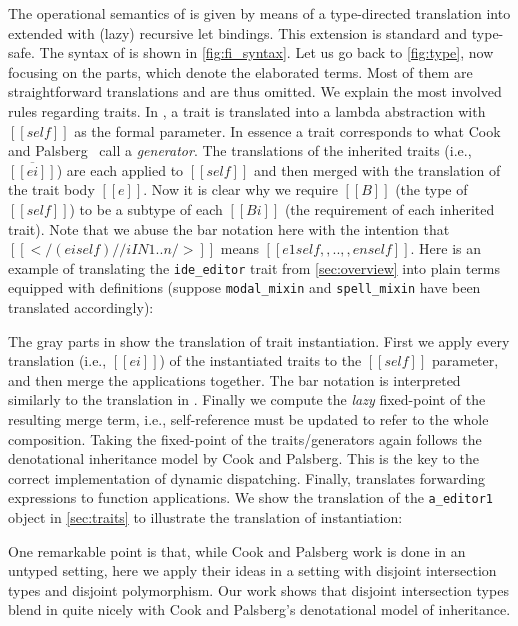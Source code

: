 The operational semantics of \name is given by means of a type-directed
translation into \bname extended with (lazy) recursive let bindings.
This extension is standard and type-safe. The syntax of \bname is shown in \cref{fig:fi_syntax}. Let us go back to
\cref{fig:type}, now focusing on the  parts, which
denote the elaborated \bname terms. Most of them
are straightforward translations and are thus omitted. We explain the most
involved rules regarding traits. In , a trait is translated into
a lambda abstraction with $[[self]]$ as the formal parameter.
In essence a trait corresponds to what Cook and Palsberg~\cite{cook1989denotational} call a \emph{generator}.
 The translations
of the inherited traits (i.e., $\overline{[[ei]]}$) are each applied to
$[[self]]$ and then merged with the translation of the trait body $[[e]]$. Now
it is clear why we require $[[B]]$ (the type of $[[self]]$) to be a subtype of each
$[[Bi]]$ (the requirement of each inherited trait). Note that we abuse the bar
notation here with the intention that $[[</ (ei self) // i IN 1..n />]]$ means
$[[e1 self ,, .. ,, en self]]$.
Here is an example of translating the \lstinline{ide_editor} trait from \cref{sec:overview} into
plain \bname terms equipped with definitions (suppose \lstinline{modal_mixin} and \lstinline{spell_mixin}
have been translated accordingly):

The gray parts in  show the translation of trait instantiation.
First we apply every translation (i.e., $[[ei]]$) of the instantiated traits to the $[[self]]$ parameter,
and then merge the applications together. The bar notation is
interpreted similarly to the translation in . Finally we compute the \emph{lazy}
fixed-point of the resulting merge term, i.e., self-reference must be updated to refer to
the whole composition. Taking the fixed-point of the
traits/generators again follows the denotational inheritance model by 
Cook and Palsberg.
 This is the key to the correct implementation of dynamic
 dispatching. Finally,
 translates forwarding expressions to function
applications. We show the translation of the
\lstinline{a_editor1} object in \cref{sec:traits} to illustrate the
translation of instantiation:

One remarkable point is that, while Cook and Palsberg work is done in
an untyped setting, here we apply their ideas in a setting with
disjoint intersection types and disjoint polymorphism. Our work shows that
disjoint intersection types blend in quite nicely with Cook and
Palsberg's denotational model of inheritance.

